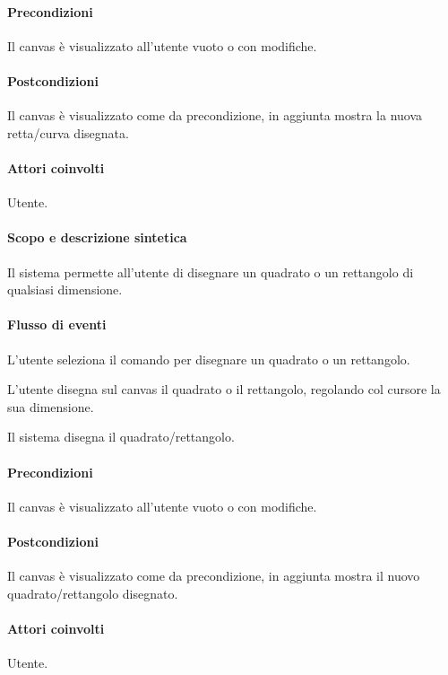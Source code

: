 \paragraph{Precondizioni} Il canvas \`e visualizzato all'utente vuoto o con modifiche.
\paragraph{Postcondizioni} Il canvas \`e visualizzato come da precondizione, in aggiunta mostra la nuova retta/curva disegnata.

\paragraph{Attori coinvolti} Utente.
\paragraph{Scopo e descrizione sintetica} 
Il sistema permette all'utente di disegnare un quadrato o un rettangolo di qualsiasi dimensione.
\paragraph{Flusso di eventi}
\begin{elenconumerato}[\textbf{}]{\subsubsecindent}
\item L'utente seleziona il comando per disegnare un quadrato o un rettangolo.
\item L'utente disegna sul canvas il quadrato o il rettangolo, regolando col cursore la sua dimensione.
\item Il sistema disegna il quadrato/rettangolo.
\end{elenconumerato}
\paragraph{Precondizioni} Il canvas \`e visualizzato all'utente vuoto o con modifiche.
\paragraph{Postcondizioni} Il canvas \`e visualizzato come da precondizione, in aggiunta mostra il nuovo quadrato/rettangolo disegnato.

\paragraph{Attori coinvolti} Utente.

